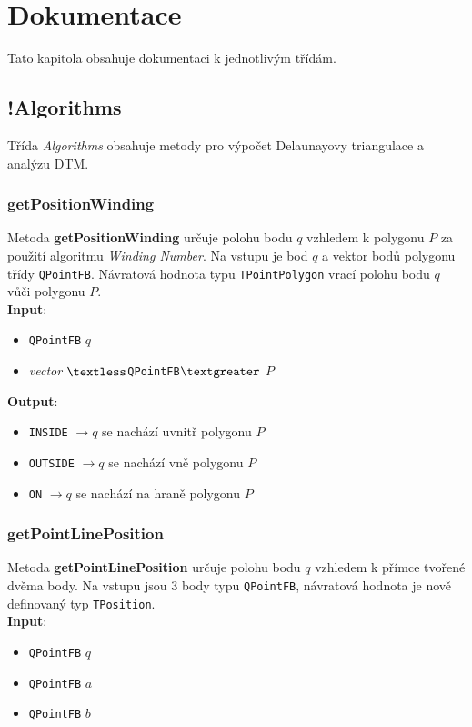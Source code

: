 \documentclass[a4paper, 12pt]{article}
\begin{document}
 
\section{Dokumentace}
Tato kapitola obsahuje dokumentaci k jednotlivým třídám.

\subsection{!Algorithms}
Třída \textit{Algorithms} obsahuje metody pro výpočet Delaunayovy triangulace a analýzu DTM.



\subsubsection{getPositionWinding}
Metoda \textbf{getPositionWinding} určuje polohu bodu $q$ vzhledem k polygonu $P$ za použití algoritmu \textsl{Winding Number}. Na vstupu je bod $q$ a vektor bodů polygonu třídy \texttt{QPointFB}. Návratová hodnota typu \texttt{TPointPolygon} vrací polohu bodu $q$ vůči polygonu $P$.\\

\textbf{Input}:
\begin{itemize}
\item \texttt{QPointFB} $q$
\item \textsl{vector} $\textless$\texttt{QPointFB}$\textgreater$ $P$
\end{itemize}

\textbf{Output}:
\begin{itemize}
\item \texttt{INSIDE} $\rightarrow q$ se nachází uvnitř polygonu $P$
\item \texttt{OUTSIDE} $\rightarrow q$ se nachází vně polygonu $P$
\item \texttt{ON} $\rightarrow q$ se nachází na hraně polygonu $P$
\end{itemize}

\subsubsection*{getPointLinePosition}
Metoda \textbf{getPointLinePosition} určuje polohu bodu $q$ vzhledem k přímce tvořené dvěma body. Na vstupu jsou 3 body typu \texttt{QPointFB}, návratová hodnota je nově definovaný typ \texttt{TPosition}.\\

\textbf{Input}:
\begin{itemize}
\item \texttt{QPointFB} $q$
\item \texttt{QPointFB} $a$
\item \texttt{QPointFB} $b$
\end{itemize}
\end{document}
